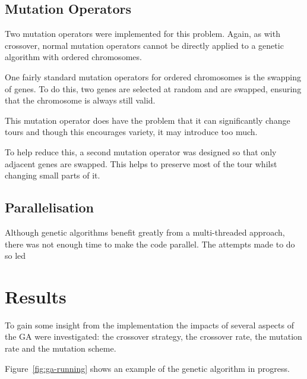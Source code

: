 \documentclass[10pt, a4paper]{article}
\begin{document}
\subsection{Mutation Operators}

Two mutation operators were implemented for this problem. Again, as with
crossover, normal mutation operators cannot be directly applied to a genetic
algorithm with ordered chromosomes.

One fairly standard mutation operators for ordered chromosomes is the swapping
of genes. To do this, two genes are selected at random and are swapped, ensuring
that the chromosome is always still valid.

This mutation operator does have the problem that it can significantly change
tours and though this encourages variety, it may introduce too much.

To help reduce this, a second mutation operator was designed so that only
adjacent genes are swapped. This helps to preserve most of the tour whilst
changing small parts of it.


\subsection{Parallelisation}

Although genetic algorithms benefit greatly from a multi-threaded approach,
there was not enough time to make the code parallel. The attempts made to do so
led 


 
\newpage
\section{Results}
\label{sec:results}

To gain some insight from the implementation the impacts of several aspects of
the GA were investigated: the crossover strategy, the crossover rate, the
mutation rate and the mutation scheme.

Figure~\ref{fig:ga-running} shows an example of the genetic algorithm in
progress.
\end{document}
